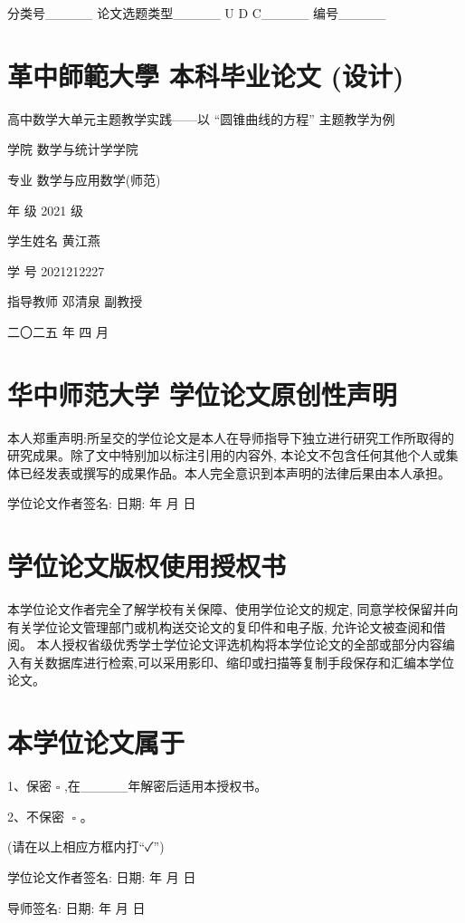 \documentclass[10pt]{article}
\begin{document}
分类号\_\_\_\_\_ 论文选题类型\_\_\_\_\_ U D C\_\_\_\_\_ 编号\_\_\_\_\_

\section*{革中師範大學 本科毕业论文 (设计)}

高中数学大单元主题教学实践——以 “圆锥曲线的方程” 主题教学为例

学院 数学与统计学学院

专业 数学与应用数学(师范)

年 级 2021 级

学生姓名 黄江燕

学 号 2021212227

指导教师 邓清泉 副教授

二〇二五 年 四 月

\section*{华中师范大学 学位论文原创性声明}

本人郑重声明:所呈交的学位论文是本人在导师指导下独立进行研究工作所取得的研究成果。除了文中特别加以标注引用的内容外, 本论文不包含任何其他个人或集体已经发表或撰写的成果作品。本人完全意识到本声明的法律后果由本人承担。

学位论文作者签名: 日期: 年 月 日

\section*{学位论文版权使用授权书}

本学位论文作者完全了解学校有关保障、使用学位论文的规定, 同意学校保留并向有关学位论文管理部门或机构送交论文的复印件和电子版, 允许论文被查阅和借阅。 本人授权省级优秀学士学位论文评选机构将本学位论文的全部或部分内容编入有关数据库进行检索,可以采用影印、缩印或扫描等复制手段保存和汇编本学位论文。

\section*{本学位论文属于}

1、保密 \(\square\) ,在\_\_\_\_\_年解密后适用本授权书。

2、不保密 \(\;\square\) 。

(请在以上相应方框内打“✓”)

学位论文作者签名: 日期: 年 月 日

导师签名: 日期: 年 月 日
\end{document}
